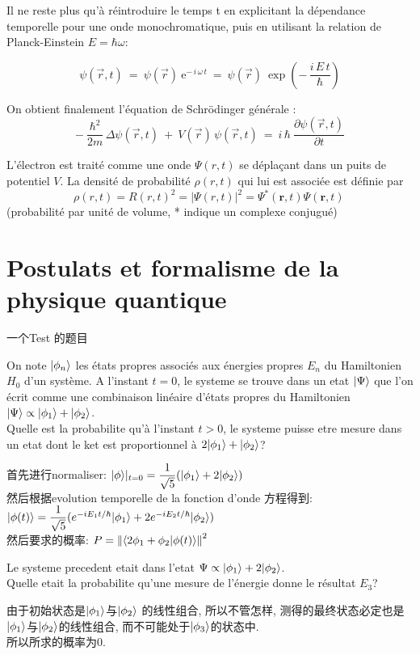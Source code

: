 Il ne reste plus qu'\`a r\'eintroduire le temps t en explicitant la d\'ependance temporelle pour une onde monochromatique, puis en utilisant la relation de Planck-Einstein $E = \hbar \omega$:

$$
\psi(\vec{r},t) \ = \ \psi(\vec{r}) \ \mathrm{e}^{- \, i \, \omega \, t} \ = \ \psi(\vec{r}) \ \exp \left( - \, \frac{i \, E \, t}{\hbar} \right)
$$

On obtient finalement l'\'equation de Schr\"odinger g\'en\'erale :
$$
- \ \frac{\hbar^2}{2m} \, \Delta \psi(\vec{r},t) \ + \ V(\vec{r}) \, \psi(\vec{r},t) \ = \ i \, \hbar \ \frac{\partial \psi(\vec{r},t)}{\partial t}
$$


L'\'electron est trait\'e comme une onde $\Psi(r,t)$ se d\'epla\c cant dans un puits de potentiel $V$.
La densit\'e de probabilit\'e $\rho(r,t)$ qui lui est associ\'ee est d\'efinie par
$$
\rho(r,t)= R(r,t)^2 = |\Psi(r,t)|^2=\Psi^*(\mathbf{r},t)\Psi(\mathbf{r},t)\,\!
$$
(probabilit\'e par unit\'e de volume, * indique un complexe conjugu\'e)

\section{Postulats et formalisme de la physique quantique}
一个Test 的题目
\begin{example}
On note $|\phi_n\rangle$ les \'etats propres associ\'es aux \'energies propres $E_n$ du Hamiltonien $H_0$ d'un syst\`eme.
A l'instant $t=0$, le systeme se trouve dans un etat $|\Psi\rangle$ que l'on \'ecrit comme une combinaison lin\'eaire d'\'etats propres
du Hamiltonien $|\Psi\rangle \propto |\phi_1\rangle + |\phi_2\rangle$.\\
Quelle est la probabilite qu'\`a l'instant $t>0$, le systeme puisse etre mesure dans un etat dont le ket est proportionnel \`a $2 |\phi_1\rangle + |\phi_2\rangle$? \par
首先进行normaliser: $|\phi\rangle|_{t = 0} = \dfrac{1}{\sqrt{5}} ( |\phi_1\rangle + 2 |\phi_2\rangle)$\\
然后根据evolution temporelle de la fonction d'onde 方程得到: $|\phi(t)\rangle = \dfrac{1}{\sqrt{5}} ( e^{-iE_1 t/ \hbar} |\phi_1\rangle + 2 e^{-iE_2 t/\hbar} |\phi_2\rangle)$\\
然后要求的概率: $P = \left\Vert \langle 2\phi_1 + \phi_2| \phi(t) \rangle\right\Vert^2$

\bigskip
Le systeme precedent etait dans l'etat $\Psi \propto |\phi_1\rangle + 2 |\phi_2\rangle$.\\
Quelle etait la probabilite qu'une mesure de l'\'energie donne le r\'esultat $E_3$? \par
由于初始状态是$|\phi_1\rangle $与$|\phi_2\rangle$ 的线性组合, 所以不管怎样, 测得的最终状态必定也是$|\phi_1\rangle $与$|\phi_2\rangle$的线性组合, 而不可能处于$|\phi_3\rangle$的状态中.\\
所以所求的概率为$0$.
\end{example}

